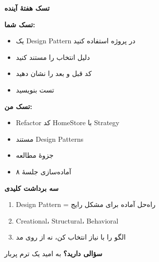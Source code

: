 \documentclass[14pt, a4paper, landscape]{extarticle}
\newcommand{\slide}[1]{%
    \newpage
    \begin{center}
    \begin{minipage}[t]{0.95\textwidth}
    \vspace{0.5cm}
    #1
    \vspace{0.5cm}
    \end{minipage}
    \end{center}
}
\newcommand{\slidetitle}[1]{%
    \begin{center}
        {\LARGE\bfseries\textcolor{primary}{#1}}
    \end{center}
    \vspace{0.5cm}
}
\newcommand{\myaccent}[1]{\textcolor{accent}{#1}}
\begin{document}
\slide{
    \slidetitle{تسک هفتهٔ آینده}
    \vspace{0.5cm}
    \begin{minipage}[t]{0.48\textwidth}
        {\bfseries\textcolor{primary}{تسک شما:}}
        \vspace{0.3cm}
        \begin{itemize}[itemsep=0.3em]
            \item یک Design Pattern در پروژه استفاده کنید
            \item دلیل انتخاب را مستند کنید
            \item کد قبل و بعد را نشان دهید
            \item تست بنویسید
        \end{itemize}
    \end{minipage}
    \hfill
    \begin{minipage}[t]{0.48\textwidth}
        {\bfseries\myaccent{تسک من:}}
        \vspace{0.3cm}
        \begin{itemize}[itemsep=0.3em]
            \item Refactor کد HomeStore با Strategy
            \item مستند Design Patterns
            \item جزوهٔ مطالعه
            \item آماده‌سازی جلسهٔ ۸
        \end{itemize}
    \end{minipage}
}

\slide{
    \slidetitle{سه برداشت کلیدی}
    \vspace{1cm}
    \begin{enumerate}[itemsep=0.8em]
        \item {\large Design Pattern = راه‌حل آماده برای مشکل رایج}
        \item {\large Creational، Structural، Behavioral}
        \item {\large الگو را با نیاز انتخاب کن، نه از روی مد}
    \end{enumerate}
}

\slide{
    \begin{center}
        \vspace{3cm}
        {\Huge\bfseries سؤالی دارید؟}
        \vspace{1.5cm}
        {\LARGE\myaccent{به امید یک ترم پربار}}
    \end{center}
}
\end{document}
